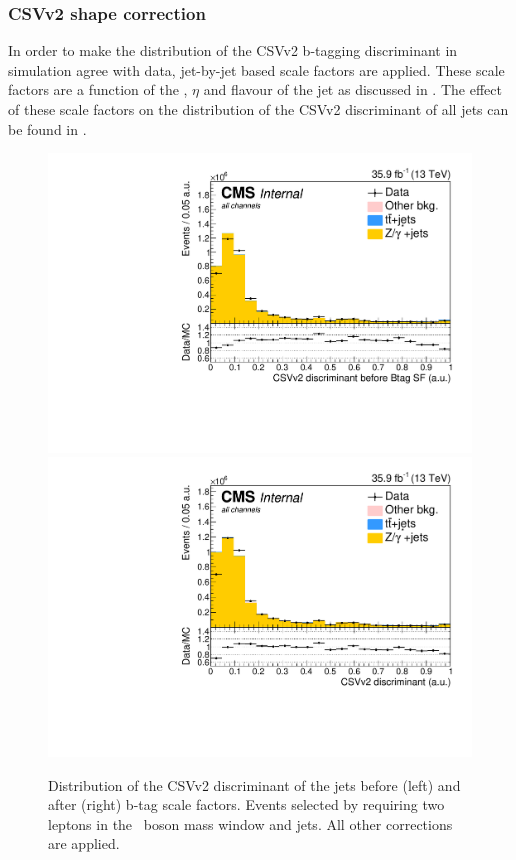 \subsubsection*{CSVv2 shape correction}
In order to make the distribution of the CSVv2 b-tagging discriminant in simulation agree with data,  jet-by-jet based scale factors are applied. These scale factors are a function of the \pt, $\eta$ and flavour of the jet as discussed in .  The effect of these scale factors on the distribution of the CSVv2 discriminant of all jets can be found in .


\begin{figure}[htbp]
	\centering
	\includegraphics[width=0.49\linewidth]{5_Eventselection/Figures/ReweighingNew/2lepcontrol_dilep_bdisc_bfBT_all_Stack}
	\includegraphics[width=0.49\linewidth]{5_Eventselection/Figures/ReweighingNew/2lepcontrol_dilep_bdisc_all_Stack}	
	\caption{Distribution of the CSVv2 discriminant of the jets before (left) and after (right) b-tag scale factors.  Events selected by requiring two leptons in the \PZ\ boson mass window and jets. All other corrections are applied.}
	\label{fig:bSF}
\end{figure}
\newpage
